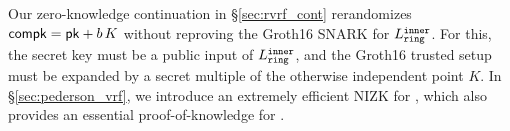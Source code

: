 Our zero-knowledge continuation in \S\ref{sec:rvrf_cont} rerandomizes
$\mathsf{compk} = \mathsf{pk} + b \, K$ without reproving the Groth16 SNARK for $L_{\mathtt{ring}}^{\mathtt{inner}}$.
For this, the secret key \sk must be a public input of $L_{\mathtt{ring}}^{\mathtt{inner}}$, and
the Groth16 trusted setup must be expanded by a secret multiple of
 the otherwise independent point $K$.
%
In \S\ref{sec:pederson_vrf}, we introduce an extremely efficient NIZK
for \Leval, which also provides an essential proof-of-knowledge for \compk.


\endinput


Ring VRFs are firstly ring signatures broadly interpreted, in that they
prove an involved public key lies inside some commitment \comring to
the plausible signer set, known as the ring.
Anyone could compute \comring from this set of public keys.
%
At the same time, ring VRFs prove correct output of a PRF keyed by
the signer's actual secret key, and evaluated on a supplied message \msg,
which then links ring VRF signatures on the same \msg.

\smallskip

